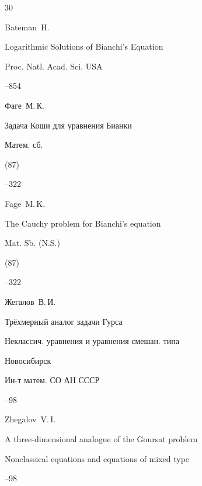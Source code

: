 \begin{thebibliography}{30}




\by Bateman~H.

\paper Logarithmic Solutions of Bianchi's Equation

\jour Proc. Natl. Acad. Sci. USA




--854






\by Фаге~М.\,К.

\paper Задача Коши для уравнения Бианки

\jour Матем. сб.


(87)


--322

\misctransl 

\by Fage~M.\,K.

\paper The Cauchy problem for Bianchi's equation

\jour Mat. Sb. (N.S.)


(87)


--322




\by Жегалов~В.\,И.

\paper Трёхмерный аналог задачи Гурса

\inbook  Неклассич. уравнения и уравнения смешан. типа


\publaddr Новосибирск

\publ Ин-т матем. СО АН СССР

--98

\misctransl

\by Zhegalov~V.\,I.

\paper  A three-dimensional analogue of the Goursat problem

\inbook Nonclassical equations and equations of mixed type 

–98


\end{thebibliography}
